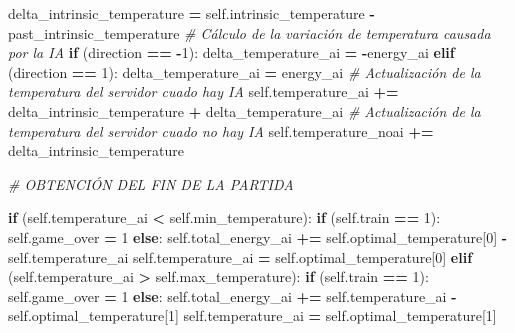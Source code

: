 \documentclass[
]{book}
\newenvironment{Shaded}{\begin{snugshade}}{\end{snugshade}}
\newcommand{\CommentTok}[1]{\textcolor[rgb]{0.56,0.35,0.01}{\textit{#1}}}
\newcommand{\ControlFlowTok}[1]{\textcolor[rgb]{0.13,0.29,0.53}{\textbf{#1}}}
\newcommand{\DecValTok}[1]{\textcolor[rgb]{0.00,0.00,0.81}{#1}}
\newcommand{\NormalTok}[1]{#1}
\newcommand{\OperatorTok}[1]{\textcolor[rgb]{0.81,0.36,0.00}{\textbf{#1}}}
\newcommand{\VariableTok}[1]{\textcolor[rgb]{0.00,0.00,0.00}{#1}}
\begin{document}
\begin{Shaded}
\begin{Highlighting}[]
\NormalTok{        delta\_intrinsic\_temperature }\OperatorTok{=} \VariableTok{self}\NormalTok{.intrinsic\_temperature}
                                      \OperatorTok{{-}}\NormalTok{ past\_intrinsic\_temperature}
        \CommentTok{\# Cálculo de la variación de temperatura causada por la IA}
        \ControlFlowTok{if}\NormalTok{ (direction }\OperatorTok{==} \OperatorTok{{-}}\DecValTok{1}\NormalTok{):}
\NormalTok{            delta\_temperature\_ai }\OperatorTok{=} \OperatorTok{{-}}\NormalTok{energy\_ai}
        \ControlFlowTok{elif}\NormalTok{ (direction }\OperatorTok{==} \DecValTok{1}\NormalTok{):}
\NormalTok{            delta\_temperature\_ai }\OperatorTok{=}\NormalTok{ energy\_ai}
        \CommentTok{\# Actualización de la temperatura del servidor cuado hay IA}
        \VariableTok{self}\NormalTok{.temperature\_ai }\OperatorTok{+=}\NormalTok{ delta\_intrinsic\_temperature }\OperatorTok{+}\NormalTok{ delta\_temperature\_ai}
        \CommentTok{\# Actualización de la temperatura del servidor cuado no hay IA}
        \VariableTok{self}\NormalTok{.temperature\_noai }\OperatorTok{+=}\NormalTok{ delta\_intrinsic\_temperature}
        
        \CommentTok{\# OBTENCIÓN DEL FIN DE LA PARTIDA}
        
        \ControlFlowTok{if}\NormalTok{ (}\VariableTok{self}\NormalTok{.temperature\_ai }\OperatorTok{\textless{}} \VariableTok{self}\NormalTok{.min\_temperature):}
            \ControlFlowTok{if}\NormalTok{ (}\VariableTok{self}\NormalTok{.train }\OperatorTok{==} \DecValTok{1}\NormalTok{):}
                \VariableTok{self}\NormalTok{.game\_over }\OperatorTok{=} \DecValTok{1}
            \ControlFlowTok{else}\NormalTok{:}
                \VariableTok{self}\NormalTok{.total\_energy\_ai }\OperatorTok{+=} \VariableTok{self}\NormalTok{.optimal\_temperature[}\DecValTok{0}\NormalTok{]}
                                        \OperatorTok{{-}} \VariableTok{self}\NormalTok{.temperature\_ai}
                \VariableTok{self}\NormalTok{.temperature\_ai }\OperatorTok{=} \VariableTok{self}\NormalTok{.optimal\_temperature[}\DecValTok{0}\NormalTok{]}
        \ControlFlowTok{elif}\NormalTok{ (}\VariableTok{self}\NormalTok{.temperature\_ai }\OperatorTok{\textgreater{}} \VariableTok{self}\NormalTok{.max\_temperature):}
            \ControlFlowTok{if}\NormalTok{ (}\VariableTok{self}\NormalTok{.train }\OperatorTok{==} \DecValTok{1}\NormalTok{):}
                \VariableTok{self}\NormalTok{.game\_over }\OperatorTok{=} \DecValTok{1}
            \ControlFlowTok{else}\NormalTok{:}
                \VariableTok{self}\NormalTok{.total\_energy\_ai }\OperatorTok{+=} \VariableTok{self}\NormalTok{.temperature\_ai}
                                        \OperatorTok{{-}} \VariableTok{self}\NormalTok{.optimal\_temperature[}\DecValTok{1}\NormalTok{]}
                \VariableTok{self}\NormalTok{.temperature\_ai }\OperatorTok{=} \VariableTok{self}\NormalTok{.optimal\_temperature[}\DecValTok{1}\NormalTok{]}
        

\end{Highlighting}
\end{Shaded}
\end{document}
